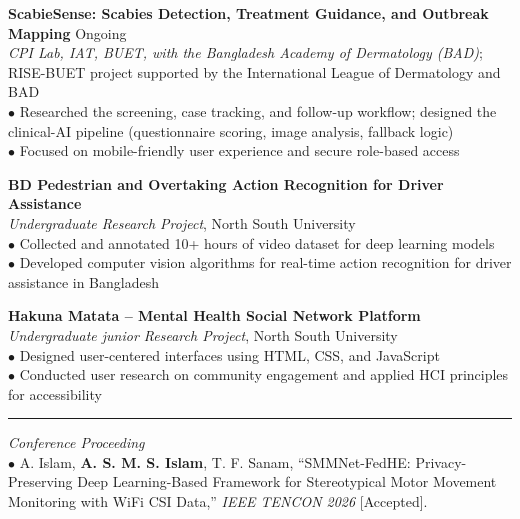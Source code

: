 \documentclass[11pt,a4paper]{article}
\renewcommand{\section}[1]{%
    \par\vspace{6pt}%
    \pagebreak[0]%
    \noindent{\large\bfseries\scshape #1}%
    \vspace{2pt}%
    \hrule%
    \vspace{6pt}%
    \nopagebreak[4]%
}
\begin{document}
\vspace{6pt}
\noindent\textbf{ScabieSense: Scabies Detection, Treatment Guidance, and Outbreak Mapping} \hfill Ongoing\\
\textit{CPI Lab, IAT, BUET, with the Bangladesh Academy of Dermatology (BAD)}; RISE-BUET project supported by the International League of Dermatology and BAD\\
$\bullet$ Researched the screening, case tracking, and follow-up workflow; designed the clinical-AI pipeline (questionnaire scoring, image analysis, fallback logic)\\
$\bullet$ Focused on mobile-friendly user experience and secure role-based access

\vspace{6pt}
\noindent\textbf{BD Pedestrian and Overtaking Action Recognition for Driver Assistance}\\
\textit{Undergraduate Research Project}, North South University\\
$\bullet$ Collected and annotated 10+ hours of video dataset for deep learning models\\
$\bullet$ Developed computer vision algorithms for real-time action recognition for driver assistance in Bangladesh

\vspace{6pt}
\noindent\textbf{Hakuna Matata -- Mental Health Social Network Platform}\\
\textit{Undergraduate junior Research Project}, North South University\\
$\bullet$ Designed user-centered interfaces using HTML, CSS, and JavaScript\\
$\bullet$ Conducted user research on community engagement and applied HCI principles for accessibility

\section{Publications and Manuscripts}

\noindent\textit{Conference Proceeding}\\
$\bullet$ A. Islam, \textbf{A. S. M. S. Islam}, T. F. Sanam, ``SMMNet-FedHE: Privacy-Preserving Deep Learning-Based Framework for Stereotypical Motor Movement Monitoring with WiFi CSI Data,'' \textit{IEEE TENCON 2026} [Accepted].
\end{document}
